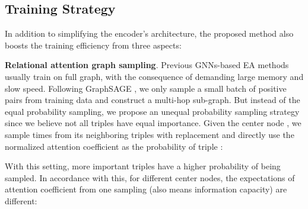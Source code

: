 \documentclass[sigconf]{acmart}
\begin{document}
\begin{table*}[t]
\renewcommand\arraystretch{0.9}
\centering
{}
\caption{Statistics of the Datasets. ,  and  are the size of entities, relations and triples respectively.}
\label{dataset}
\vspace{-1em}
\end{table*}

\subsection{Training Strategy}
\label{sec:ts}
In addition to simplifying the encoder's architecture, the proposed method also boosts the training efficiency from three aspects:

\vspace{0.5em}
\noindent
\textbf{Relational attention graph sampling}.
Previous GNNs-based EA methods \cite{DBLP:conf/emnlp/WangLLZ18,DBLP:conf/wsdm/MaoWXLW20,DBLP:conf/acl/CaoLLLLC19} usually train on full graph, with the consequence of demanding large memory and slow speed.
Following GraphSAGE \cite{DBLP:conf/nips/HamiltonYL17}, we only sample a small batch of positive pairs from training data and construct a multi-hop sub-graph.
But instead of the equal probability sampling, we propose an unequal probability sampling strategy since we believe not all triples have equal importance.
Given the center node , we sample  times from its neighboring triples with replacement and directly use the normalized attention coefficient  as the probability of triple :

With this setting, more important triples have a higher probability of being sampled.
In accordance with this, for different center nodes, the expectations of attention coefficient from one sampling (also means information capacity) are different:
\end{document}
